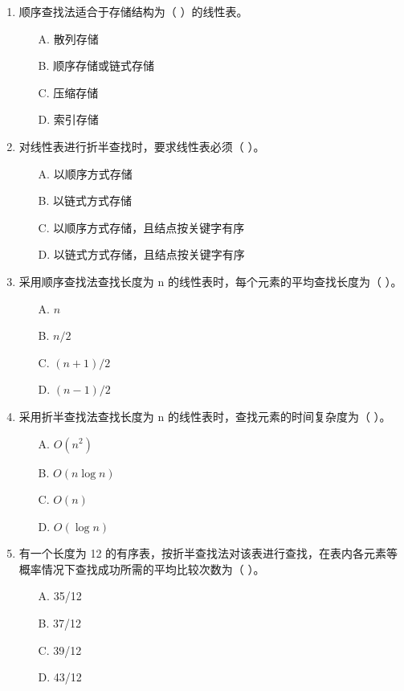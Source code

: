 \documentclass[12pt, a4paper]{article}
\begin{document}
\begin{enumerate}
    \item 顺序查找法适合于存储结构为（ ）的线性表。
    \begin{enumerate}
        \item[A.] 散列存储
        \item[B.] 顺序存储或链式存储
        \item[C.] 压缩存储
        \item[D.] 索引存储
    \end{enumerate}
    
    \item 对线性表进行折半查找时，要求线性表必须（ ）。
    \begin{enumerate}
        \item[A.] 以顺序方式存储
        \item[B.] 以链式方式存储
        \item[C.] 以顺序方式存储，且结点按关键字有序
        \item[D.] 以链式方式存储，且结点按关键字有序
    \end{enumerate}
    
    \item 采用顺序查找法查找长度为 n 的线性表时，每个元素的平均查找长度为（ ）。
    \begin{enumerate}
        \item[A.] $n$
        \item[B.] $n/2$
        \item[C.] $(n+1)/2$
        \item[D.] $(n-1)/2$
    \end{enumerate}
    
    \item 采用折半查找法查找长度为 n 的线性表时，查找元素的时间复杂度为（ ）。
    \begin{enumerate}
        \item[A.] $O(n^2)$
        \item[B.] $O(n \log n)$
        \item[C.] $O(n)$
        \item[D.] $O(\log n)$
    \end{enumerate}
    
    \item 有一个长度为 12 的有序表，按折半查找法对该表进行查找，在表内各元素等概率情况下查找成功所需的平均比较次数为（ ）。
    \begin{enumerate}
        \item[A.] 35/12
        \item[B.] 37/12
        \item[C.] 39/12
        \item[D.] 43/12
    \end{enumerate}
    

\end{enumerate}
\end{document}
